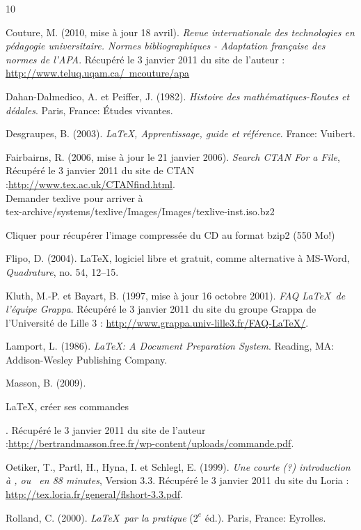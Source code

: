 \bigskip


\begin{thebibliography}{10}

 Couture, M. (2010, mise à jour 18 avril). {\em Revue internationale des technologies en pédagogie universitaire. Normes bibliographiques - Adaptation française des normes de l’APA}. Récupéré le 3 janvier 2011 du site de l’auteur :  \href {http://www.teluq.uqam.ca/~mcouture/apa}{http://www.teluq.uqam.ca/~mcouture/apa}

 Dahan-Dalmedico, A.  et Peiffer, J. (1982). {\em Histoire des mathématiques-Routes et dédales}. Paris, France: Études vivantes.

 Desgraupes, B. (2003). {\em \LaTeX, Apprentissage, guide et référence}. France: Vuibert.

 Fairbairns, R. (2006, mise à jour le 21 janvier 2006). {\em Search CTAN For a File}, Récupéré le 3 janvier 2011 du site de CTAN :\href{http://www.tex.ac.uk/CTANfind.html}{http://www.tex.ac.uk/CTANfind.html}.\\
Demander texlive pour arriver à \\tex-archive/systems/texlive/Images/Images/texlive-inst.iso.bz2

Cliquer pour récupérer l'image compressée du CD au format bzip2 (550 Mo!)

 Flipo, D. (2004).  \LaTeX, logiciel libre et gratuit, comme alternative à MS-Word, {\em Quadrature}, no. 54, 12--15. 

  Kluth, M.-P. et Bayart, B. (1997, mise à jour 16 octobre 2001). {\em FAQ  \LaTeX~de l'équipe Grappa}. Récupéré le 3 janvier 2011 du site du groupe Grappa de l'Université de Lille 3 : \href{http://www.grappa.univ-lille3.fr/FAQ-LaTeX/}{http://www.grappa.univ-lille3.fr/FAQ-LaTeX/}.

 Lamport, L. (1986). {\em \LaTeX: A Document Preparation System}. Reading, MA: Addison-Wesley Publishing Company.

 Masson, B. (2009). \begin{itshape}{\LaTeX, créer ses commandes}\end{itshape}. Récupéré le 3 janvier 2011 du site de l'auteur :\href {http://bertrandmasson.free.fr/wp-content/uploads/commande.pdf}{http://bertrandmasson.free.fr/wp-content/uploads/commande.pdf}.

 Oetiker, T., Partl, H., Hyna, I. et Schlegl, E. (1999). {\em Une courte (?) introduction à \LaTeXe, ou  \LaTeXe~en 88 minutes}, Version 3.3. Récupéré le 3 janvier 2011 du site du Loria : \href{http://tex.loria.fr/general/flshort-3.3.pdf}{http://tex.loria.fr/general/flshort-3.3.pdf}. 

Rolland, C. (2000). {\em \LaTeX~par la pratique} ($2^e$ éd.). Paris, France: Eyrolles.

\end{thebibliography}

